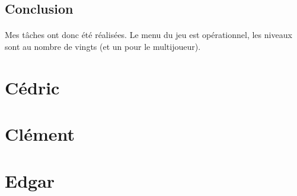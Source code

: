 \documentclass[titlepage, 13px, a4paper]{report}
\begin{document}
\subsection{Conclusion}
\paragraph{} \hspace{0pt}
Mes tâches ont donc été réalisées. Le menu du jeu est opérationnel, les niveaux
sont au nombre de vingts (et un pour le multijoueur). \\


\newpage
\section{Cédric}
\paragraph{} \hspace{0pt}


\newpage
\section{Clément}
\paragraph{} \hspace{0pt}


\newpage
\section{Edgar}
\end{document}
